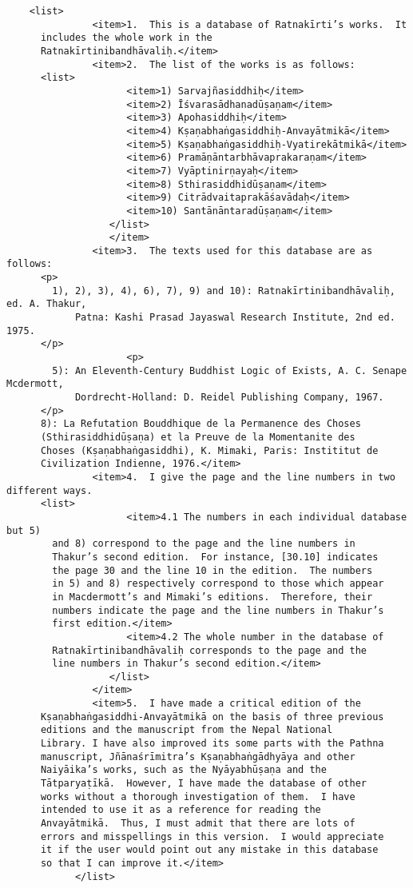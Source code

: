 \documentclass[article,a4paper]{memoir}
\begin{document}
\begin{landscape}
\begin{verbatim}
	<list>
               <item>1.  This is a database of Ratnakīrti’s works.  It
	  includes the whole work in the
	  Ratnakīrtinibandhāvaliḥ.</item>
               <item>2.  The list of the works is as follows:
	  <list>
                     <item>1) Sarvajñasiddhiḥ</item>
                     <item>2) Īśvarasādhanadūṣaṇam</item>
                     <item>3) Apohasiddhiḥ</item>
                     <item>4) Kṣaṇabhaṅgasiddhiḥ-Anvayātmikā</item>
                     <item>5) Kṣaṇabhaṅgasiddhiḥ-Vyatirekātmikā</item>
                     <item>6) Pramāṇāntarbhāvaprakaraṇam</item>
                     <item>7) Vyāptinirṇayaḥ</item>
                     <item>8) Sthirasiddhidūṣaṇam</item>
                     <item>9) Citrādvaitaprakāśavādaḥ</item>
                     <item>10) Santānāntaradūṣaṇam</item>
                  </list>
	              </item>
               <item>3.  The texts used for this database are as follows:
	  <p>
	    1), 2), 3), 4), 6), 7), 9) and 10): Ratnakīrtinibandhāvaliḥ, ed. A. Thakur, 
            Patna: Kashi Prasad Jayaswal Research Institute, 2nd ed. 1975.
	  </p>
	                 <p>
	    5): An Eleventh-Century Buddhist Logic of Exists, A. C. Senape Mcdermott, 
            Dordrecht-Holland: D. Reidel Publishing Company, 1967.
	  </p>
	  8): La Refutation Bouddhique de la Permanence des Choses
	  (Sthirasiddhidūṣaṇa) et la Preuve de la Momentanite des
	  Choses (Kṣaṇabhaṅgasiddhi), K. Mimaki, Paris: Instititut de
	  Civilization Indienne, 1976.</item>
               <item>4.  I give the page and the line numbers in two different ways.
	  <list>
                     <item>4.1 The numbers in each individual database but 5)
	    and 8) correspond to the page and the line numbers in
	    Thakur’s second edition.  For instance, [30.10] indicates
	    the page 30 and the line 10 in the edition.  The numbers
	    in 5) and 8) respectively correspond to those which appear
	    in Macdermott’s and Mimaki’s editions.  Therefore, their
	    numbers indicate the page and the line numbers in Thakur’s
	    first edition.</item>
                     <item>4.2 The whole number in the database of
	    Ratnakīrtinibandhāvaliḥ corresponds to the page and the
	    line numbers in Thakur’s second edition.</item>
                  </list>
               </item>
               <item>5.  I have made a critical edition of the
	  Kṣaṇabhaṅgasiddhi-Anvayātmikā on the basis of three previous
	  editions and the manuscript from the Nepal National
	  Library. I have also improved its some parts with the Pathna
	  manuscript, Jñānaśrīmitra’s Kṣaṇabhaṅgādhyāya and other
	  Naiyāika’s works, such as the Nyāyabhūṣaṇa and the
	  Tātparyaṭīkā.  However, I have made the database of other
	  works without a thorough investigation of them.  I have
	  intended to use it as a reference for reading the
	  Anvayātmikā.  Thus, I must admit that there are lots of
	  errors and misspellings in this version.  I would appreciate
	  it if the user would point out any mistake in this database
	  so that I can improve it.</item>
            </list>


\end{verbatim}
\end{landscape}
\end{document}

